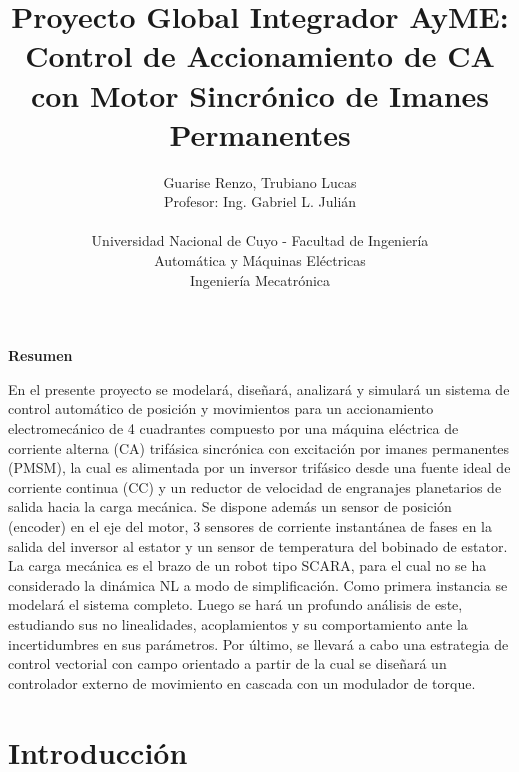 \documentclass[10pt]{article}
\title{Proyecto Global Integrador AyME:\\
Control de Accionamiento de CA con Motor Sincrónico de Imanes Permanentes}
\author{Guarise Renzo, Trubiano Lucas\\
Profesor: Ing. Gabriel L. Julián\\
\\
Universidad Nacional de Cuyo - Facultad de Ingeniería\\
Automática y Máquinas Eléctricas\\
Ingeniería Mecatrónica}
\begin{document}
\maketitle

\begin{center} %
    {\Large \textbf{Resumen}}
\end{center}

En el presente proyecto se modelará, diseñará, analizará y simulará un sistema de control automático de posición y movimientos para un accionamiento electromecánico de 4 cuadrantes compuesto por una máquina eléctrica de corriente alterna (CA) trifásica sincrónica con excitación por imanes permanentes (PMSM), la cual es alimentada por un inversor trifásico desde una fuente ideal de corriente continua (CC) y un reductor de velocidad de engranajes planetarios de salida hacia la carga mecánica. Se dispone además un sensor de posición (encoder) en el eje del motor, 3 sensores de corriente instantánea de fases en la salida del inversor al estator y un sensor de temperatura del bobinado de estator. La carga mecánica es el brazo de un robot tipo SCARA, para el cual no se ha considerado la dinámica NL a modo de simplificación. Como primera instancia se modelará el sistema completo. Luego se hará un profundo análisis de este, estudiando sus no linealidades, acoplamientos y su comportamiento ante la incertidumbres en sus parámetros. Por último, se llevará a cabo una estrategia de control vectorial con campo orientado a partir de la cual se diseñará un controlador externo de movimiento en cascada con un modulador de torque.



\section{Introducción}
\end{document}
